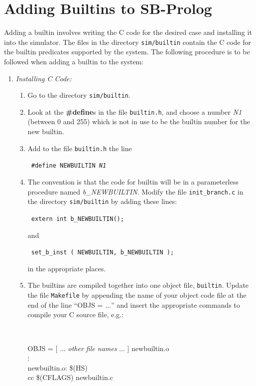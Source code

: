 \section{Adding Builtins to SB-Prolog} \label{adding_builtins}
Adding a builtin involves writing the C code for the desired case and installing
it into the simulator.
The files in the directory {\tt sim/builtin}
contain the C code for the builtin predicates supported by the system.
The following procedure is to be followed when adding a builtin to the system:

\begin{enumerate}
\item {\em Installing C Code:}
\begin{enumerate}
\item Go to the directory {\tt sim/builtin}.
\item Look at the {\bf \#define}s in the file {\tt builtin.h},
    and choose a number {\em N1} (between 0 and 255)
    which is not in use to be the builtin number for the new builtin.
\item Add to the file {\tt builtin.h} the line
\begin{tabbing}\tt
	\#define NEWBUILTIN {\em N1}
\end{tabbing}
\item The convention is that the code for builtin will be in a parameterless
    procedure named {\em b\_NEWBUILTIN}.
    Modify the file {\tt init\_branch.c} in the directory {\tt sim/builtin}
    by adding these lines:
\begin{tabbing}\tt
	extern int b\_NEWBUILTIN();
\end{tabbing}
and
\begin{tabbing}\tt
	set\_b\_inst ( NEWBUILTIN, b\_NEWBUILTIN );
\end{tabbing}
in the appropriate places.
\item The builtins are compiled together into one object file, {\tt builtin}.
    Update the file {\tt Makefile} by appending the name of your object code
    file at the end of the line ``OBJS = $\ldots$''
    and insert the appropriate commands to compile your C source file, e.g.:\\
\begin{minipage}{\textwidth} \tt\centering
\begin{tabbing}
OBJS = [ $\ldots$ {\em other file names} $\ldots$ ] newbuiltin.o \\
$\vdots$ \\
newbuiltin.o: \$(HS) \\
        cc \$(CFLAGS) newbuiltin.c
\end{tabbing}
\end{minipage}


\end{enumerate}
\end{enumerate}
